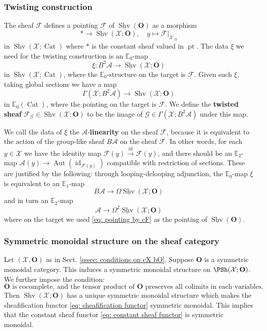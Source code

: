 \documentclass[10pt]{amsart}
\newcommand{\sssec}{\subsubsection}
\theoremstyle{remark}
\newcommand{\te}{\text}
\newcommand{\ul}{\underline}
\newcommand{\E}{\mathbb{E}}
\newcommand{\on}{\operatorname}
\newcommand{\cA}{\mathcal{A}}
\newcommand{\cF}{\mathcal{F}}
\newcommand{\cG}{\mathcal{G}}
\newcommand{\cX}{\mathcal{X}}
\newcommand{\Cat}{\on{Cat}}
\newcommand{\Shv}{\on{Shv}}
\newcommand{\id}{\on{id}}
\newcommand{\bO}{\mathbf{O}}
\newcommand{\pt}{\on{pt}}
\begin{document}
\sssec{Twisting construction}\label{sssec: twisting construction}
The sheaf $\cF$ defines a pointing $\ul{\cF}$ of $\ul{\Shv}(\bO)$ as a morphism 
\begin{equation}\label{eq: pointing by cF}
    \ast\rightarrow \ul{\Shv}(\cX;\bO),\quad y\mapsto \cF|_{\cX_{/y}}
\end{equation}
in $\Shv(\cX;\Cat)$ where $\ast$ is the constant sheaf valued in $\pt$.
The data $\xi$ we need for the twisting construction is an
$\E_0$-map
\begin{equation}\label{eq: twisting data}
\xi:B^2 \cA\rightarrow \ul{\Shv}(\cX;\bO)
\end{equation}
in $\Shv(\cX;\Cat)$,
where the $\E_0$-structure on the target is $\ul{\cF}$.
Given such $\xi$, taking global sections we have a map
\[\Gamma(\cX;B^2 \cA)\rightarrow \Shv(\cX;\bO)\]
in $\E_0(\Cat)$, where the pointing on the target is $\cF$. We define the \textbf{twisted sheaf} $\cF_{\cG}\in \Shv(\cX;\bO)$ to be the image of $\cG\in \Gamma(\cX;B^2\cA)$ under this map.
\medskip

We call the data of $\xi$ the $\cA$-\textbf{linearity} on the sheaf $\cF$, because it is equivalent to the action of the group-like sheaf $B\cA$ on the sheaf $\cF$. In other words, for each $y\in \cX$ we have the identity map $\cF(y)\xrightarrow{\id}\cF(y)$, and there should be an $\E_2$-map
$\cA(y)\rightarrow \on{Aut}(\id_{\cF(y)})$
compatible with restriction of sections. These are justified by the following: through looping-delooping adjunction, the $\E_0$-map $\xi$ is equivalent to an $\E_1$-map
\[B\cA\rightarrow\Omega\ul{\Shv}(\cX;\bO)\]
and in turn an $\E_2$-map
\[\cA\rightarrow \Omega^2\ul{\Shv}(\cX;\bO)\]
where on the target we used \eqref{eq: pointing by cF} as the pointing of $\ul{\Shv}(\bO)$.


\sssec{Symmetric monoidal structure on the sheaf category}\label{sssec: sym mon str on Shv}
Let $(\cX,\bO)$ as in Sect. \ref{sssec: conditions on cX bO}.
Suppose $\bO$ is a symmetric monoidal category. This induces a symmetric monoidal structure on $\PSh(\cX;\bO)$. We further impose the condition:
\[\bO\te{ is cocomplete, and the tensor product of } \bO \te{ preserves all colimits in each variables.}\]
Then $\Shv(\cX;\bO)$ has a unique symmetric monoidal structure which makes the sheafification functor \eqref{eq: sheafification functor} symmetric monoidal. This implies that the constant sheaf functor \eqref{eq: constant sheaf functor} is symmetric monoidal.
\medskip
\end{document}
